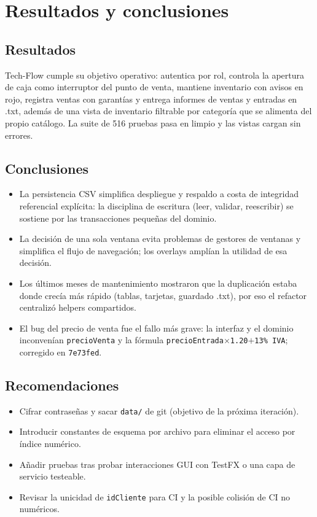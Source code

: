 \chapter{Resultados y conclusiones}

\section{Resultados}
Tech-Flow cumple su objetivo operativo: autentica por rol, controla la apertura de caja como interruptor del punto de venta, mantiene inventario con avisos en rojo, registra ventas con garantías y entrega informes de ventas y entradas en .txt, además de una vista de inventario filtrable por categoría que se alimenta del propio catálogo. La suite de 516 pruebas pasa en limpio y las vistas cargan sin errores.

\section{Conclusiones}
\begin{itemize}
\item La persistencia CSV simplifica despliegue y respaldo a costa de integridad referencial explícita: la disciplina de escritura (leer, validar, reescribir) se sostiene por las transacciones pequeñas del dominio.
\item La decisión de una sola ventana evita problemas de gestores de ventanas y simplifica el flujo de navegación; los overlays amplían la utilidad de esa decisión.
\item Los últimos meses de mantenimiento mostraron que la duplicación estaba donde crecía más rápido (tablas, tarjetas, guardado .txt), por eso el refactor centralizó helpers compartidos.
\item El bug del precio de venta fue el fallo más grave: la interfaz y el dominio inconvenían \texttt{precioVenta} y la fórmula \texttt{precioEntrada$\times$1.20$+$13\% IVA}; corregido en \texttt{7e73fed}.
\end{itemize}

\section{Recomendaciones}
\begin{itemize}
\item Cifrar contraseñas y sacar \texttt{data/} de git (objetivo de la próxima iteración).
\item Introducir constantes de esquema por archivo para eliminar el acceso por índice numérico.
\item Añadir pruebas tras probar interacciones GUI con TestFX o una capa de servicio testeable.
\item Revisar la unicidad de \texttt{idCliente} para CI y la posible colisión de CI no numéricos.
\end{itemize}
